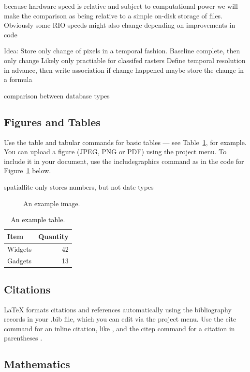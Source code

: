 \documentclass[fleqn,10pt]{wlpeerj}
\begin{document}
because hardware speed is relative and subject to computational power we will make the comparison as being relative to a simple on-disk storage of files. 
Obviously some RIO speeds might also change depending on improvements in code

Idea: Store only change of pixels in a temporal fashion. Baseline complete, then only change
Likely only practiable for classifed rasters
Define temporal resolution in advance, then write association if change happened
maybe store the change in a formula

comparison between database types


\subsection*{Figures and Tables}


Use the table and tabular commands for basic tables --- see Table~\ref{tab:widgets}, for example. You can upload a figure (JPEG, PNG or PDF) using the project menu. To include it in your document, use the includegraphics command as in the code for Figure~\ref{fig:view} below.

spatiallite only stores numbers, but not date types


\begin{figure}[ht]
\centering
\caption{An example image.}
\label{fig:view}
\end{figure}

\begin{table}[ht]
\centering
\begin{tabular}{l|r}
Item & Quantity \\\hline
Widgets & 42 \\
Gadgets & 13
\end{tabular}
\caption{\label{tab:widgets}An example table.}
\end{table}

\subsection*{Citations}

LaTeX formats citations and references automatically using the bibliography records in your .bib file, which you can edit via the project menu. Use the cite command for an inline citation, like \cite{Figueredo:2009dg}, and the citep command for a citation in parentheses \citep{Figueredo:2009dg}.

\subsection*{Mathematics}
\end{document}
